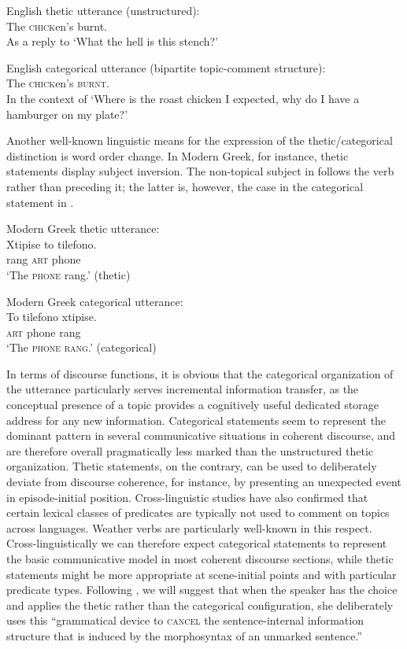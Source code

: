 \documentclass[output=paper]{langsci/langscibook}
\begin{document}
\ea
{ English thetic utterance (unstructured):}\\
  The \textsc{chick}en’s burnt. \\
  As a reply to ‘What the hell is this stench?’
\z

\ea
{ English categorical utterance (bipartite topic-comment structure):}\\
  The \textsc{chick}en’s \textsc{burnt}. \\
  In the context of ‘Where is the roast chicken I expected, why do I have a hamburger on my plate?’ \citep[529]{Sasse1987}
\z

Another well-known linguistic means for the expression of the thetic/categorical distinction is word order change. In Modern Greek, for instance, thetic statements display subject inversion. The non-topical subject in  follows the verb rather than preceding it; the latter is, however, the case in the categorical statement in .

\ea\label{ex:schwarz:3}
{Modern Greek thetic utterance:}\\
\gll Xtipise    to    tilefono. \\
     rang    \textsc{art}    phone\\
\glt ‘The \textsc{phone} rang.’ (thetic)
\z

\ea\label{ex:schwarz:4}
{ Modern Greek   categorical utterance:}\\
\gll To     tilefono   xtipise.\\
     \textsc{art}    phone     rang\\
\glt ‘The \textsc{phone rang}.’ (categorical) \citep[536]{Sasse1987}
\z

In terms of discourse functions, it is obvious that the categorical organization of the utterance particularly serves incremental information transfer, as the conceptual presence of a topic provides a cognitively useful dedicated storage address for any new information. Categorical statements seem to represent the dominant pattern in several communicative situations in coherent discourse, and are therefore overall pragmatically less marked than the unstructured thetic organization. Thetic statements, on the contrary, can be used to deliberately deviate from discourse coherence, for instance, by presenting an unexpected event in episode-initial position. Cross-linguistic studies \citep{Sasse1995} have also confirmed that certain lexical classes of predicates are typically not used to comment on topics across languages. Weather verbs are particularly well-known in this respect. Cross-linguistically we can therefore expect categorical statements to represent the basic communicative model in most coherent discourse sections, while thetic statements might be more appropriate at scene-initial points and with particular predicate types. Following \citet[86]{Güldemann2010}, we will suggest that when the speaker has the choice and applies the thetic rather than the categorical configuration, she deliberately uses this “grammatical device to \textsc{cancel} the sentence-internal information structure that is induced by the morphosyntax of an unmarked sentence.”
\end{document}
